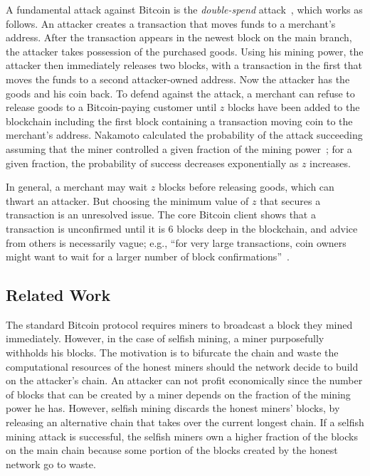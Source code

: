 A fundamental attack against Bitcoin is the {\em double-spend} attack~\cite{Nakamoto:2009},
which works as follows. An attacker creates a transaction that moves
funds to a merchant's address. After the transaction appears in the
newest block on the main branch, the attacker takes possession of the purchased
goods. Using his mining power, the attacker then immediately releases
two blocks, with a transaction in the first that moves the funds to a
second attacker-owned address. Now the attacker has the goods and his
coin back. To defend against the attack, a merchant can refuse to
release goods to a Bitcoin-paying customer until $z$ blocks have been
added to the blockchain including the first block containing a
transaction moving coin to the merchant's address.  Nakamoto
calculated the probability of the attack succeeding assuming that the
miner controlled a given fraction of the mining power~\cite{Nakamoto:2009};
for a given fraction, the probability of success decreases exponentially as $z$
increases. 

In general, a merchant may wait $z$ blocks before releasing goods,
which can thwart an attacker.
But choosing the minimum value of $z$ that secures a transaction is an
unresolved issue. The core Bitcoin client shows that a transaction is
unconfirmed until it is 6 blocks deep in the
blockchain\cite{bitcoin:confirmation}, and   advice from others is necessarily vague; e.g., ``for very large transactions, coin
owners might want to wait for a larger number of block
confirmations''~\cite{Bonneau:2015a}.   

\subsection{Related Work}
The standard Bitcoin protocol requires miners to broadcast a block they mined immediately. However, in the case of selfish mining, a miner purposefully withholds his blocks. The motivation is to bifurcate the chain and waste the computational resources of the honest miners should the network decide to build on the attacker's chain. An attacker can not profit economically since the number of blocks that can be created by a miner depends on the fraction of the mining power he has. However, selfish mining discards the honest miners' blocks, by releasing an alternative chain that takes over the current longest chain. If a selfish mining attack is successful, the selfish miners own a higher fraction of the blocks on the main chain because some portion of the blocks created by the honest network go to waste.

